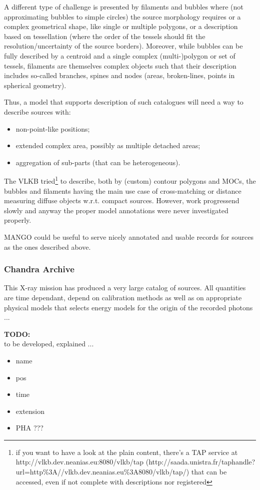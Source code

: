 \documentclass[11pt,a4paper]{ivoa}
\newcommand{\TODO}[1]{%
    \noindent%
    \colorbox{todocolor}{%
            \parbox{0.85\linewidth}{\sffamily \textbf{TODO:}\\
            #1}
    }%
    \vspace{2pt}

}
\begin{document}
A different type of challenge is presented by filaments and bubbles
where (not approximating bubbles to simple circles) the source
morphology requires or a complex geometrical shape, like single or
multiple polygons, or a description based on tessellation (where the
order of the tessels should fit the resolution/uncertainty of the source
borders). Moreover, while bubbles can be fully described by a centroid
and a single complex (multi-)polygon or set of tessels, filaments are
themselves complex objects such that their description includes
so-called branches, spines and nodes (areas, broken-lines, points in
spherical geometry).

Thus, a model that supports description of such catalogues will need a
way to describe sources with:
\begin{itemize}
	\item non-point-like positions;
	\item extended complex area, possibly as multiple detached areas;
	\item aggregation of sub-parts (that can be heterogeneous).
\end{itemize}

The VLKB tried\footnote{if you want to have a look at the plain
content, there's a TAP service at
http://vlkb.dev.neanias.eu:8080/vlkb/tap (http://saada.unistra.fr/taphandle?url=http\%3A//vlkb.dev.neanias.eu\%3A8080/vlkb/tap/) that can be accessed, even if
not complete with descriptions nor registered} to describe, both by
(custom) contour polygons and MOCs,
the bubbles and filaments having the main use case of cross-matching or
distance measuring diffuse objects w.r.t. compact sources. However, work
progressend slowly and anyway the proper model annotations were never
investigated properly.

MANGO could be useful to serve nicely annotated and usable records for
sources as the ones described above.

\subsubsection{Chandra Archive}
This X-ray mission has produced a very large catalog of sources. %
All quantities are time dependant, depend on calibration methods as well as on appropriate physical
models that selects energy models for the origin of the recorded photons ...


\TODO{to be developed, explained ...}
\begin{itemize}
    \item name
    \item pos
    \item time
    \item extension
    \item PHA ???
\end{itemize}
\end{document}
